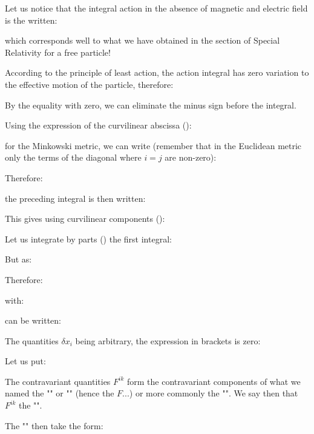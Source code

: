 	Let us notice that the integral action in the absence of magnetic and electric field is the written:
	
	which corresponds well to what we have obtained in the section of Special Relativity for a free particle!

	According to the principle of least action, the action integral has zero variation to the effective motion of the particle, therefore:
	
	\begin{tcolorbox}[title=Remark,colframe=black,arc=10pt]
	By the equality with zero, we can eliminate the minus sign before the integral.
	\end{tcolorbox}
	Using the expression of the curvilinear abscissa ():
	
	for the Minkowski metric, we can write (remember that in the Euclidean metric only the terms of the diagonal where $i=j$ are non-zero):
	
	Therefore:
	
	the preceding integral is then written:
	
	This gives using curvilinear components ():
	
	Let us integrate by parts () the first integral:
	
	But as:
	
	Therefore:
	
	with:
	
	can be written:
	
	The quantities $\delta x_i$ being arbitrary, the expression in brackets is zero:
	
	Let us put:
	
	The contravariant quantities $F^{ik}$ form the contravariant components of what we named the "" or "" (hence the $F$...) or more commonly the "". We say then that $F^{ik}$ the "".

	The "" then take the form:
	

